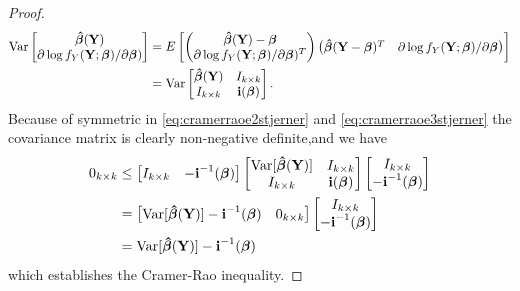 \begin{proof}
\begin{align*}
    \operatorname{\text{Var}} \begin{bmatrix}  \boldsymbol{\hat{\beta}}(\textbf{Y}) \\  \partial \log f_Y(\textbf{Y};\boldsymbol{\beta})/\partial \boldsymbol{\beta}) \end{bmatrix} &= E \begin{bmatrix} \begin{pmatrix} \boldsymbol{\hat{\beta}}(\textbf{Y})-\boldsymbol{\beta} \\  \partial \log f_Y(\textbf{Y};\boldsymbol{\beta})/\partial \boldsymbol{\beta})^T\end{pmatrix} \begin{pmatrix} \boldsymbol{\hat{\beta}}(\textbf{Y}-\boldsymbol{\beta})^T &  \partial \log f_Y(\textbf{Y};\boldsymbol{\beta})/\partial \boldsymbol{\beta} \end{pmatrix}\end{bmatrix}  \\
    &= \operatorname{\text{Var}} \begin{bmatrix} \boldsymbol{\hat{\beta}}(\textbf{Y}) & I_{k \times k}\\
    I_{k \times k} & \textbf{i}(\boldsymbol{\beta})\end{bmatrix}.
\end{align*}
Because of symmetric in \eqref{eq:cramerraoe2stjerner} and \eqref{eq:cramerraoe3stjerner} the covariance matrix is clearly non-negative definite,and we have
\begin{align*}
    0_{k \times k} & \leq \begin{bmatrix} I_{k\times k} & -\textbf{i}^{-1}(\boldsymbol{\beta})\end{bmatrix} \begin{bmatrix} \operatorname{\text{Var}}[\boldsymbol{\hat{\beta}}(\textbf{Y})] & I_{k\times k} \\ I_{k\times k} & \textbf{i}(\boldsymbol{\beta}) \end{bmatrix}\begin{bmatrix} I_{k\times k} \\ -\textbf{i}^{-1}(\boldsymbol{\beta})\end{bmatrix} \\
    &= \begin{bmatrix} \operatorname{\text{Var}}[\boldsymbol{\hat{\beta}}(\textbf{Y})] -\textbf{i}^{-1}(\boldsymbol{\beta}) & 0_{k \times k}\end{bmatrix} \begin{bmatrix} I_{k\times k} \\ -\textbf{i}^{-1}(\boldsymbol{\beta})\end{bmatrix} \\
    &= \operatorname{\text{Var}}[\boldsymbol{\hat{\beta}}(\textbf{Y})] -\textbf{i}^{-1}(\boldsymbol{\beta})
\end{align*}
which establishes the Cramer-Rao inequality.
\end{proof}

